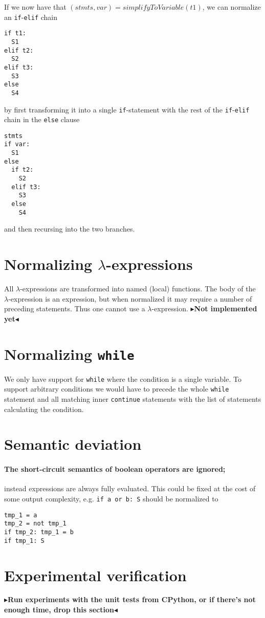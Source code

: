 \documentclass[11pt]{report}
\newcommand{\todo}[1]{{\color[rgb]{.5,0,0}\textbf{$\blacktriangleright$#1$\blacktriangleleft$}}}
\begin{document}
If we now have that $(stmts, var) = simplifyToVariable(t1)$, we can
normalize an \verb!if!-\verb!elif! chain
\begin{verbatim}
if t1:
  S1
elif t2:
  S2
elif t3:
  S3
else
  S4
\end{verbatim}
by first transforming it into a single \verb!if!-statement with the rest of the
\verb!if!-\verb!elif! chain in the \verb!else! clause
\begin{verbatim}
stmts
if var:
  S1
else
  if t2:
    S2
  elif t3:
    S3
  else
    S4
\end{verbatim}
and then recursing into the two branches.

\section{Normalizing $\lambda$-expressions}
All $\lambda$-expressions are transformed into named (local) functions. The body
of the $\lambda$-expression is an expression, but when normalized it may require
a number of preceding statements. Thus one cannot use a $\lambda$-expression.
\todo{Not implemented yet}

\section{Normalizing {\tt while}}
We only have support for {\tt while} where the condition is a single
variable. To support arbitrary conditions we would have to precede the
whole {\tt while} statement and all matching inner {\tt continue}
statements with the list of statements calculating the condition.

\section{Semantic deviation}
\paragraph{The short-circuit semantics of boolean operators are ignored;}
  instead expressions are always fully evaluated. This could be fixed
  at the cost of some output complexity, e.g. \verb|if a or b: S| should
  be normalized to
\begin{verbatim}
tmp_1 = a
tmp_2 = not tmp_1
if tmp_2: tmp_1 = b
if tmp_1: S
\end{verbatim}

\section{Experimental verification}
\todo{Run experiments with the unit tests from CPython, or if there's
  not enough time, drop this section}
\end{document}
